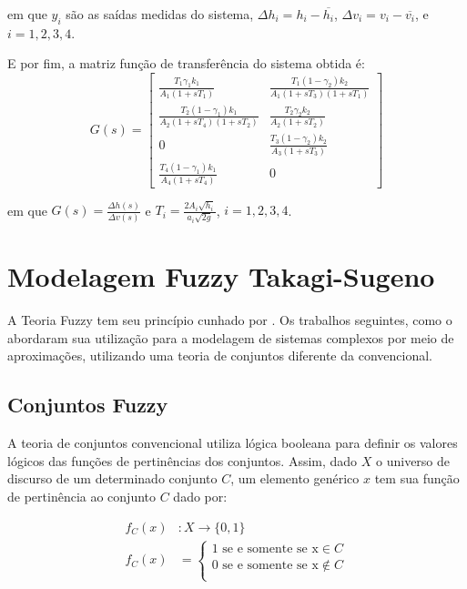 em que $y_{i}$ são as saídas medidas do sistema, $\Delta h_{i}=h_{i} - \overline{h_{i}}$, $\Delta v_{i}=v_{i} - \overline{v_{i}}$, e $i=1,2,3,4$.

E por fim, a matriz função de transferência do sistema obtida é:
\begin{equation}
	G(s) = 
	\begin{bmatrix}
		\frac{T_{1}\gamma_{1}k_{1}}{A_{1}(1+sT_{1})} &  \frac{T_{1}(1-\gamma_{2})k_{2}}{A_{1}(1+sT_{3})(1+sT_{1})} \\
		\frac{T_{2}(1-\gamma_{1})k_{1}}{A_{2}(1+sT_{4})(1+sT_{2})} &  \frac{T_{2}\gamma_{2}k_{2}}{A_{2}(1+sT_{2})} \\
		0 &  \frac{T_{3}(1-\gamma_{2})k_{2}}{A_{3}(1+sT_{3})} \\
		\frac{T_{4}(1-\gamma_{1})k_{1}}{A_{4}(1+sT_{4})} &  0 
	\end{bmatrix} 
	\label{eq4}
\end{equation}

em que $G(s)=\frac{\Delta h(s)}{\Delta v(s)}$ e $T_{i}=\frac{2A_{i}\sqrt{h_{i}}}{a_{i}\sqrt{2g}}$, $i=1,2,3,4$.

\section{Modelagem Fuzzy Takagi-Sugeno} \label{secModFuzzy}
\indent A Teoria Fuzzy tem seu princípio cunhado por \cite{zadeh65}. Os trabalhos seguintes, como o \cite{takagi_sugeno} abordaram sua utilização para a modelagem de sistemas complexos por meio de aproximações, utilizando uma teoria de conjuntos diferente da convencional.

\subsection{Conjuntos Fuzzy}
\indent A teoria de conjuntos convencional utiliza lógica booleana para definir os valores lógicos das funções de pertinências dos conjuntos. Assim, dado $X$ o universo de discurso de um determinado conjunto $C$, um elemento genérico $x$ tem sua função de pertinência ao conjunto $C$ dado por:

\begin{align*}
	f_{C}(x)&:X \rightarrow \{0,1\} \quad \\
	f_{C}(x)&= 
	\begin{cases}
		1 \text{ se e somente se x} \in C \\
		0 \text{ se e somente se x} \notin C\\
	\end{cases}
\end{align*}

